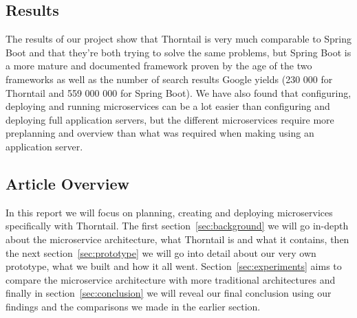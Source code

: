 \subsection{Results}
The results of our project show that Thorntail is very much comparable to Spring Boot and that they’re both trying to solve the same problems, but Spring Boot is a more mature and documented framework proven by the age of the two frameworks as well as the number of search results Google yields (230 000 for Thorntail and 559 000 000 for Spring Boot). We have also found that configuring, deploying and running microservices can be a lot easier than configuring and deploying full application servers, but the different microservices require more preplanning and overview than what was required when making using an application server.
\newpage
\subsection{Article Overview}
In this report we will focus on planning, creating and deploying microservices specifically with Thorntail. The first section~\ref{sec:background} we will go in-depth about the microservice architecture, what Thorntail is and what it contains, then the next section~\ref{sec:prototype} we will go into detail about our very own prototype, what we built and how it all went. Section~\ref{sec:experiments} aims to compare the microservice architecture with more traditional architectures and finally in section~\ref{sec:conclusion} we will reveal our final conclusion using our findings and the comparisons we made in the earlier section.
